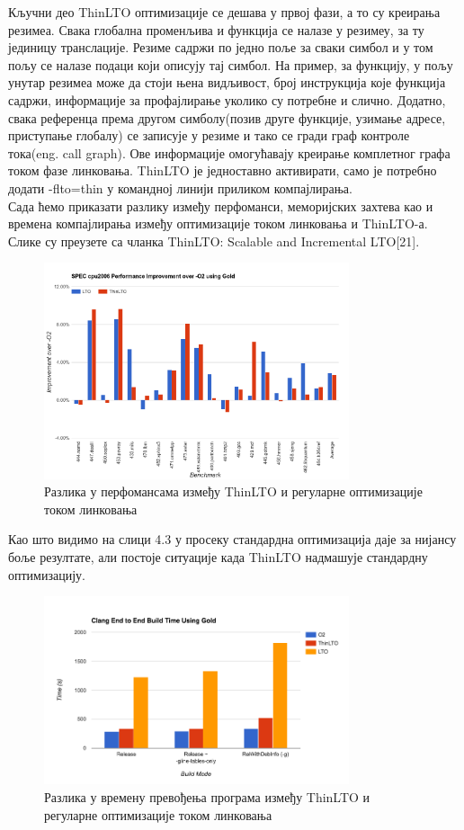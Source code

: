 \documentclass[12pt,oneside]{memoir}
\begin{document}
Кључни део ThinLTO оптимизације се дешава у првој фази, а то су креирања резимеа.
Свака глобална променљива и функција се налазе у резимеу, за ту јединицу транслације.
Резиме садржи по једно поље за сваки симбол и у том пољу
се налазе подаци који описују тај симбол.
На пример, за функцију, у пољу унутар резимеа може да стоји њена видљивост, 
број инструкција које функција садржи, информације за профајлирање уколико су потребне
и слично.
Додатно, свака референца према другом симболу(позив друге функције, узимање адресе,
приступање глобалу) се записује у резиме и тако се гради граф контроле тока(eng. call graph).
Ове информације омогућавају креирање комплетног графа током фазе линковања.
ThinLTO је једноставно активирати, само је потребно додати  -flto=thin у командној линији
приликом компајлирања.
\\
Сада ћемо приказати разлику између перфоманси, меморијских захтева као и времена
компајлирања између оптимизације током линковања и ThinLTO-а.
Слике су преузете са чланка ThinLTO: Scalable and Incremental LTO[21].

\begin{figure}[!ht]
  \centering
  \includegraphics[width=0.8\textwidth]{thin_perfomance.png}
  \caption{Разлика у перфомансама између ThinLTO и регуларне оптимизације током линковања }
  \label{fig:grafikon}
\end{figure}

Као што видимо на слици 4.3 у просеку стандардна оптимизација даје за нијансу
боље резултате, али постоје ситуације када ThinLTO надмашује стандардну оптимизацију.


\begin{figure}[!ht]
  \centering
  \includegraphics[width=0.8\textwidth]{build_time.png}
  \caption{Разлика у времену превођења програма
   између ThinLTO и регуларне оптимизације током линковања }
  \label{fig:grafikon}
\end{figure}
\end{document}
